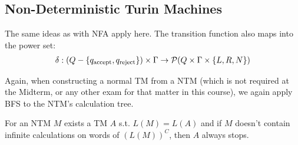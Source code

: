\subsection{Non-Deterministic Turin Machines}
The same ideas as with NFA apply here. The transition function also maps into the power set:
\rmvspace
\begin{align*}
    \delta : (Q - \{ q_{\text{accept}}, q_{\text{reject}} \}) \times \Gamma \rightarrow \mathcal{P}(Q \times \Gamma \times \{ L, R, N \})
\end{align*}

Again, when constructing a normal TM from a NTM (which is not required at the Midterm, or any other exam for that matter in this course),
we again apply BFS to the NTM's calculation tree.

\inlinetheorem For an NTM $M$ exists a TM $A$ s.t. $L(M) = L(A)$ and if $M$ doesn't contain infinite calculations on words of $(L(M))^C$, then $A$ always stops.
